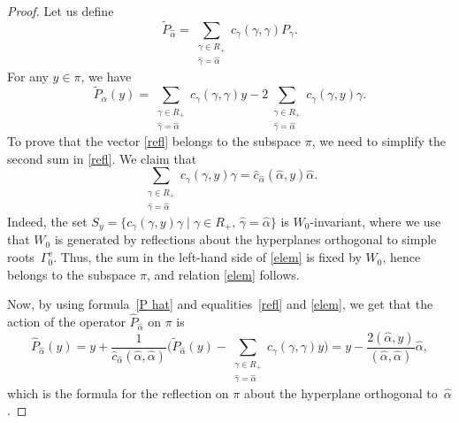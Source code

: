\documentclass[10pt,a4paper]{amsart}
\begin{document}
\begin{proof}
Let us define 
\begin{equation*}
    \widetilde{P}_{\widehat{\alpha}} = \sum_{\substack{ \gamma \in R_+ \\ \widehat{\gamma} = \widehat{\alpha}}} 
     c_{\gamma}(\gamma, \gamma) P_{\gamma}.
\end{equation*}
For any $y \in \pi$, we have
\begin{equation}
\label{refl}
    \widetilde{P}_{\widehat{\alpha}}(y) %
    = \sum\limits_{\substack{\gamma \in R_{+} \\ \widehat{\gamma} = \widehat{\alpha}}}c_{\gamma}(\gamma, \gamma) y - 2\sum\limits_{\substack{\gamma \in R_{+} \\\widehat{\gamma} = \widehat{\alpha}}} c_{\gamma} (\gamma,y) \gamma. 
\end{equation}
To prove that the vector \eqref{refl} belongs to the subspace $\pi$, we need to simplify the second sum in \eqref{refl}. We claim that 
\begin{equation}
\label{elem}
     \sum\limits_{\substack{\gamma \in R_{+} \\ \widehat{\gamma} = \widehat{\alpha}}} c_{\gamma} (\gamma,y) \gamma =  \widehat{c}_{\widehat{\alpha}} (\widehat{\alpha},y) \widehat{\alpha}.
\end{equation}
Indeed, 
the set $S_{y} = \{c_{\gamma} (\gamma,y)\gamma \mid \gamma \in R_+, \, \widehat{\gamma} = \widehat{\alpha}\}$  
is $W_0$-invariant, where we use that $W_0$ is generated by reflections about the hyperplanes orthogonal to simple roots~$\Gamma_0^v$. 
Thus, the sum in the left-hand side of \eqref{elem} is fixed by $W_0$, hence belongs to the subspace $\pi$, and relation \eqref{elem} follows.

Now,
by using formula~\eqref{P hat} and equalities~\eqref{refl} and \eqref{elem},
we get that the action of the operator $\widehat{P}_{\widehat{\alpha}}$ on $\pi$ is
\begin{equation*}
    \widehat{P}_{\widehat{\alpha}} (y) = y +
    \frac{1}{\widehat{c}_{\widehat{\alpha}} (\widehat{\alpha}, \widehat{\alpha})} \bigg(  \widetilde{P}_{\widehat{\alpha}}(y)-\sum_{\substack{ \gamma \in R_+ \\\widehat{\gamma} = \widehat{\alpha}}} 
    c_{\gamma}(\gamma, \gamma) y \bigg)
    = y - \frac{2 (\widehat{\alpha}, y)}{(\widehat{\alpha}, \widehat{\alpha})} \widehat{\alpha},
\end{equation*}
which is the formula for the reflection on $\pi$ about the hyperplane orthogonal to~$\widehat{\alpha}$.
\end{proof}
\end{document}
